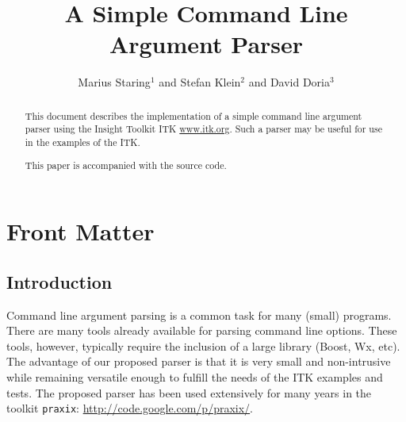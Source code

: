 \documentclass{InsightArticle}
\title{A Simple Command Line Argument Parser}
\author{Marius Staring$^{1}$ and Stefan Klein$^{2}$ and David Doria$^{3}$ }
\newcommand{\IJhandlerIDnumber}{3258}
\begin{document}
%
%
\IJhandlefooter{\IJhandlerIDnumber}


\ifpdf
\else
\fi

\maketitle

\ifhtml
\chapter*{Front Matter\label{front}}
\fi

\begin{abstract}
\noindent This document describes the implementation of a simple
command line argument parser using the Insight Toolkit ITK
\url{www.itk.org}. Such a parser may be useful for use in the
examples of the ITK.

This paper is accompanied with the source code.
\end{abstract}

\IJhandlenote{\IJhandlerIDnumber}

\tableofcontents


\section{Introduction}

Command line argument parsing is a common task for many (small)
programs. There are many tools already available for parsing command
line options. These tools, however, typically require the inclusion
of a large library (Boost, Wx, etc). The advantage of our proposed
parser is that it is very small and non-intrusive while remaining
versatile enough to fulfill the needs of the ITK examples and tests. The
proposed parser has been used extensively for many years in the
toolkit \texttt{praxix}: \url{http://code.google.com/p/praxix/}.
\end{document}

